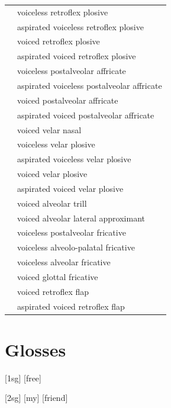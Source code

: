 \documentclass{article}
\begin{document}
\begin{xltabular}{\textwidth}{lL}
   & voiceless retroflex plosive \\
   & aspirated voiceless retroflex plosive \\
   & voiced retroflex plosive \\
   & aspirated voiced retroflex plosive \\
  \ipa{\t{\textteshlig}} & voiceless postalveolar affricate \\
   & aspirated voiceless postalveolar affricate \\
  \ipa{\t{\textdyoghlig}} & voiced postalveolar affricate \\
   & aspirated voiced postalveolar affricate \\
   & voiced velar nasal \\
   & voiceless velar plosive \\
   & aspirated voiceless velar plosive \\
   & voiced velar plosive \\
   & aspirated voiced velar plosive \\
   & voiced alveolar trill \\
   & voiced alveolar lateral approximant \\
   & voiceless postalveolar fricative \\
   & voiceless alveolo-palatal fricative \\
   & voiceless alveolar fricative \\
  \ipa{\texthth} & voiced glottal fricative \\
   & voiced retroflex flap \\
   & aspirated voiced retroflex flap \\
\end{xltabular}

\newpage\section{Glosses}

\ex[lingstyle=custom_nlevel]
\begingl
{}[{\sc 1sg}]
[free]
\endgl
\xe

\ex[lingstyle=custom_nlevel]
\begingl
{}[{\sc 2sg}]
[my]
[friend]
\endgl
\xe
\end{document}
